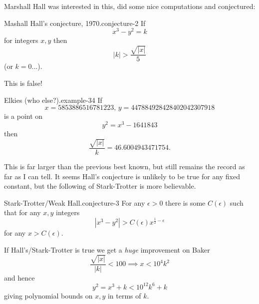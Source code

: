 \documentclass[10pt,]{book}
\numberwithin{equation}{section}
\newcommand{\lt}{<}
\newcommand{\gt}{>}
\begin{document}
\par
\hypertarget{p-711}{}%
Marshall Hall was interested in this, did some nice computations and conjectured:%
\begin{conjecture}{Mashall Hall's conjecture, 1970.}{}{conjecture-2}%
\hypertarget{p-712}{}%
If%
\begin{equation*}
x^3 - y^2 = k
\end{equation*}
for integers \(x,y\) then%
\begin{equation*}
|k| \gt \frac{\sqrt{|x|}}{5}
\end{equation*}
(or \(k =0\)...).%
\end{conjecture}
\hypertarget{p-713}{}%
This is false!%
\begin{example}{Elkies (who else?).}{example-34}%
\hypertarget{p-714}{}%
If%
\begin{equation*}
x= 5853886516781223,\,y = 447884928428402042307918
\end{equation*}
is a point on%
\begin{equation*}
y^2 = x^3 - 1641843
\end{equation*}
then%
\begin{equation*}
\frac{\sqrt{|x|}}{k} = 46.6004943471754\text{.}
\end{equation*}
%
\end{example}
\hypertarget{p-715}{}%
This is far larger than the previous best known, but still remains the record as far as I can tell. It seems Hall's conjecture is unlikely to be true for any fixed constant, but the following of Stark-Trotter is more believable.%
\begin{conjecture}{Stark-Trotter/Weak Hall.}{}{conjecture-3}%
\hypertarget{p-716}{}%
For any  \(\epsilon \gt 0\) there is some \(C(\epsilon)\) such that for any \(x,y\) integers%
\begin{equation*}
|x^3 - y^2| \gt C(\epsilon) x^{\frac12 - \epsilon}
\end{equation*}
for any \(x \gt C(\epsilon)\).%
\end{conjecture}
\hypertarget{p-717}{}%
If Hall's/Stark-Trotter is true we get a \emph{huge} improvement on Baker%
\begin{equation*}
\frac{\sqrt{|x|}}{|k|} \lt 100 \implies x \lt 10^4k^2
\end{equation*}
and hence%
\begin{equation*}
y^2 = x^3 + k \lt 10^{12}k^6 + k
\end{equation*}
giving polynomial bounds on \(x,y\) in terms of \(k\).%
\par
\end{document}
